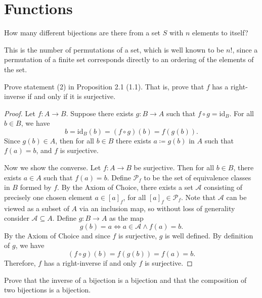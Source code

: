 \documentclass[11pt]{report}
\begin{document}
\section{Functions}
\begin{exercise}
	How many different bijections are there from a set $S$ with $n$ elements to itself?
\end{exercise}
\begin{solution}
	This is the number of permutations of a set, which is well known to be $n!$, since a permutation of a finite set corresponds directly to an ordering of the elements of the set.
\end{solution}
\begin{exercise}
	Prove statement (2) in Proposition 2.1 (1.1). That is, prove that $f$ has a right-inverse if and only if it is surjective.
\end{exercise}
\begin{proof}
	Let $f : A \to B$. Suppose there exists $g : B \to A$ such that $f\circ g=\mathrm{id}_B$. For all $b\in B$, we have
	\[
		b=\mathrm{id}_B(b)=(f\circ g)(b)=f(g(b))
	.\]
	Since $g(b)\in A$, then for all $b\in B$ there exists $a\coloneqq g(b)$ in $A$ such that $f(a)=b$, and $f$ is surjective.

	Now we show the converse. Let $f : A \to B$ be surjective. Then for all $b\in B$, there exists $a\in A$ such that $f(a)=b$. Define $\mathscr{P}_f$ to be the set of equivalence classes in $B$ formed by $f$. By the Axiom of Choice, there exists a set $\mathscr{A} $ consisting of precisely one chosen element $a\in[a]_f$, for all $[a]_f \in \mathscr{P}_f$. Note that $\mathscr{A}$ can be viewed as a subset of $A$ via an inclusion map, so without loss of generality consider $\mathscr{A} \subseteq A$. Define $g : B \to A$ as the map
	\[
		g(b)=a \iff a\in \mathscr{A} \land f(a)=b
	.\]
	By the Axiom of Choice and since $f$ is surjective, $g$ is well defined. By definition of $g$, we have
	\[
		(f\circ g)(b)=f(g(b))=f(a)=b
	.\]
	Therefore, $f$ has a right-inverse if and only $f$ is surjective.
\end{proof}
\begin{exercise}
	Prove that the inverse of a bijection is a bijection and that the composition of two bijections is a bijection.
\end{exercise}
\end{document}
